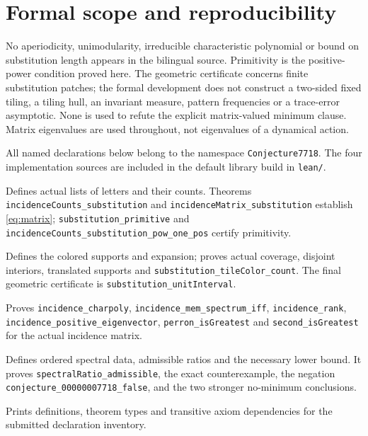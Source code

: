 \documentclass[11pt,a4paper]{article}
\newcommand{\code}[1]{\nolinkurl{#1}}
\begin{document}
\section{Formal scope and reproducibility}
\small\setlength{\parskip}{4pt}
No aperiodicity, unimodularity, irreducible characteristic polynomial or bound on substitution length appears in the bilingual source. Primitivity is the positive-power condition proved here. The geometric certificate concerns finite substitution patches; the formal development does not construct a two-sided fixed tiling, a tiling hull, an invariant measure, pattern frequencies or a trace-error asymptotic. None is used to refute the explicit matrix-valued minimum clause. Matrix eigenvalues are used throughout, not eigenvalues of a dynamical action.

All named declarations below belong to the namespace \code{Conjecture7718}. The four implementation sources are included in the default library build in \code{lean/}.
\begin{description}\raggedright\setlength{\itemsep}{2pt}\setlength{\parsep}{0pt}
\item[\code{Substitution.lean}] Defines actual lists of letters and their counts. Theorems \code{incidenceCounts_substitution} and \code{incidenceMatrix_substitution} establish \eqref{eq:matrix}; \code{substitution_primitive} and \code{incidenceCounts_substitution_pow_one_pos} certify primitivity.
\item[\code{Tiling.lean}] Defines the colored supports and expansion; proves actual coverage, disjoint interiors, translated supports and \code{substitution_tileColor_count}. The final geometric certificate is \code{substitution_unitInterval}.
\item[\code{Spectrum.lean}] Proves \code{incidence_charpoly}, \code{incidence_mem_spectrum_iff}, \code{incidence_rank}, \code{incidence_positive_eigenvector}, \code{perron_isGreatest} and \code{second_isGreatest} for the actual incidence matrix.
\item[\code{Conjecture7718.lean}] Defines ordered spectral data, admissible ratios and the necessary lower bound. It proves \code{spectralRatio_admissible}, the exact counterexample, the negation \code{conjecture_00000007718_false}, and the two stronger no-minimum conclusions.
\item[\code{Check.lean}] Prints definitions, theorem types and transitive axiom dependencies for the submitted declaration inventory.
\end{description}
\end{document}
